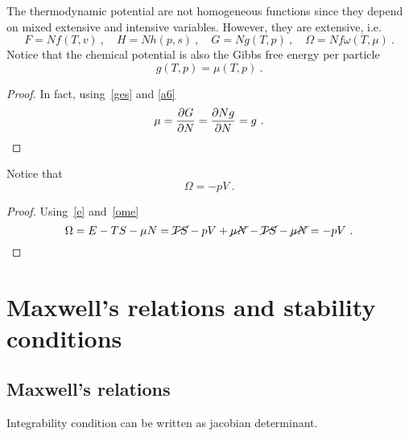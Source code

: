     The thermodynamic potential are not homogeneous functions since they depend on mixed extensive and intensive variables. However, they are extensive, i.e. 
    \begin{equation}\label{a6}
        F = N f(T, v) ~, \quad H = N h(p, s) ~, \quad G = N g(T, p) ~, \quad \Omega = N f \omega (T, \mu) ~. 
    \end{equation}
    Notice that the chemical potential is also the Gibbs free energy per particle
    \begin{equation}
        g(T, p) = \mu(T, p) ~.
    \end{equation}
    \begin{proof}
        In fact, using~\eqref{ges} and \eqref{a6}
        \begin{equation*}
            \mu = \frac{\partial G}{\partial N} = \frac{\partial Ng }{\partial N} = g ~.
        \end{equation*}
    \end{proof}

    Notice that 
    \begin{equation*}
        \Omega = - pV ~.
    \end{equation*}
    \begin{proof}
        Using~\eqref{e} and~\eqref{ome}
        \begin{equation*}
            \Omega = E - TS - \mu N = \cancel{TS} - pV + \cancel{\mu N} - \cancel{TS} - \cancel{\mu N} = - pV ~.
        \end{equation*}
    \end{proof}

\chapter{Maxwell's relations and stability conditions}

\section{Maxwell's relations}

    Integrability condition can be written as jacobian determinant. 

